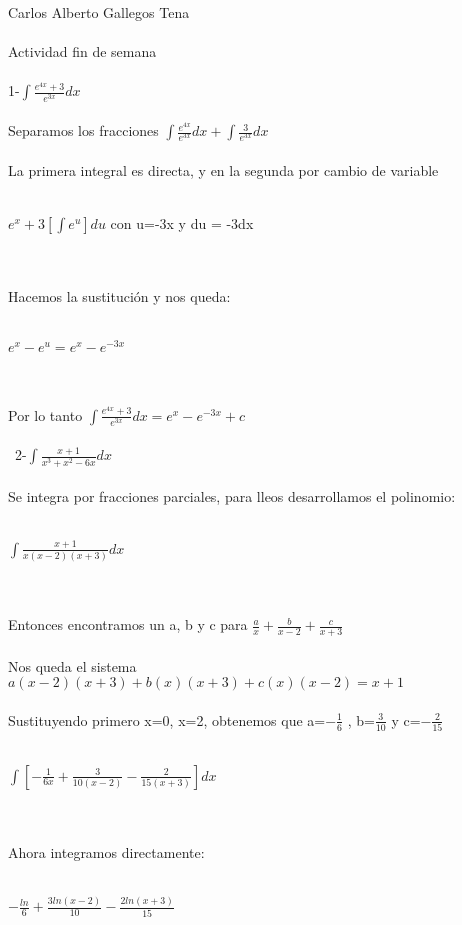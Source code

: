 \documentclass[a4paper,10pt]{article}
\title{}
\author{}
\date{}
\begin{document}
\maketitle
Carlos Alberto Gallegos Tena\\\\
Actividad fin de semana\\\\
1-$\int \frac{e^{4x}+3}{e^{3x}} dx $\\\\
Separamos los fracciones $\int \frac{e^{4x}}{e^{3x}} dx + \int \frac{3}{e^{3x}} dx$\\\\
La primera integral es directa, y en la segunda por cambio de variable\\\\
\centerline{$e^x + 3[\int e^u]du $ con u=-3x y du = -3dx}\\\\
Hacemos la sustitución y nos queda:\\\\
\centerline{$e^x - e^u = e^x - e^{-3x}$}\\\\
Por lo tanto $\int \frac{e^{4x}+3}{e^{3x}} dx = e^x - e^{-3x} +c $\\\\\
2-$\int \frac{x+1}{x^3 + x^2 -6x} dx $\\\\
Se integra por fracciones parciales, para lleos desarrollamos el polinomio:\\\\
\centerline{$\int \frac{x+1}{x(x-2)(x+3)} dx $}\\\\
Entonces encontramos un a, b y c para $\frac{a}{x} + \frac{b}{x-2} + \frac{c}{x+3}$\\\\
Nos queda el sistema $a(x-2)(x+3) + b(x)(x+3) + c(x)(x-2) = x+1$\\\\
Sustituyendo primero x=0, x=2, obtenemos que a=$-\frac{1}{6}$ , b=$\frac{3}{10}$ y c=$-\frac{2}{15}$\\\\
\centerline{$\int [-\frac{1}{6x} + \frac{3}{10(x-2)} - \frac{2}{15(x+3)}] dx $}\\\\
Ahora integramos directamente:\\\\
\centerline{$-\frac{ln}{6} + \frac{3ln(x-2)}{10} - \frac{2ln(x+3)}{15}$}\\\\
\end{document}
